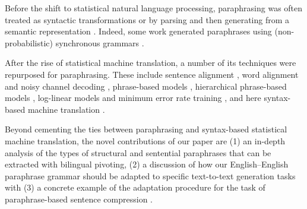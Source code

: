\documentclass[11pt]{article}
\begin{document}
Before the shift to statistical natural language processing,
paraphrasing was often treated as syntactic transformations or by
parsing and then generating from a semantic representation
\cite{mckeown:1979:ACL,Muraki1982,Meteer1988,Shemtov1996,Yamamoto2002}.
Indeed, some work generated paraphrases using (non-probabilistic)
synchronous grammars
\cite{Shieber1990,Dras1997,Dras1999,Kozlowski2003}.

After the rise of statistical machine translation, a number of its
techniques were repurposed for paraphrasing.  These include sentence
alignment \cite{Gale1993,Barzilay2003a}, word alignment and noisy
channel decoding \cite{Brown1990,Quirk2004}, phrase-based models
\cite{Koehn2003,Callison-Burch2005}, hierarchical phrase-based models
\cite{Chiang2005,Madnani2007}, log-linear models and minimum error
rate training \cite{Och2003c,Madnani2007,Zhao2008b}, and here
syntax-based machine translation
\cite{Wu1997,Yamada2001,Melamed2004,Quirk2005}.


Beyond cementing the ties between paraphrasing and syntax-based
statistical machine translation, the novel contributions of our paper
are (1) an in-depth analysis of the types of structural and sentential
paraphrases that can be extracted with bilingual pivoting, (2) a
discussion of how our English--English paraphrase grammar should be
adapted to specific text-to-text generation tasks
\cite{zhao-EtAl:2009:ACLIJCNLP2} with (3) a concrete example of the
adaptation procedure for the task of paraphrase-based sentence
compression \cite{KnightMarcuAI02,cohn-lapata:2008,Cohn2009}.





\end{document}
